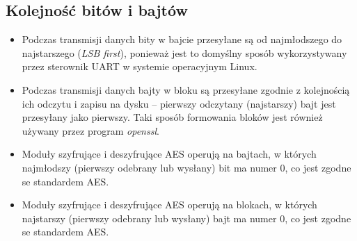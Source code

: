 \subsection{Kolejność bitów i bajtów}
\begin{itemize}
\item Podczas transmisji danych bity w bajcie przesyłane są od najmłodszego do najstarszego (\textit{LSB first}), ponieważ jest to domyślny sposób wykorzystywany przez sterownik UART w systemie operacyjnym Linux.
\item Podczas transmisji danych bajty w bloku są przesyłane zgodnie z kolejnością ich odczytu i zapisu na dysku -- pierwszy odczytany (najstarszy) bajt jest przesyłany jako pierwszy. Taki sposób formowania bloków jest również używany przez program \textit{openssl}.
\item Moduły szyfrujące i deszyfrujące AES operują na bajtach, w których najmłodszy (pierwszy odebrany lub wysłany) bit ma numer 0, co jest zgodne se standardem AES.
\item Moduły szyfrujące i deszyfrujące AES operują na blokach, w których najstarszy (pierwszy odebrany lub wysłany) bajt ma numer 0, co jest zgodne se standardem AES.
\end{itemize}


